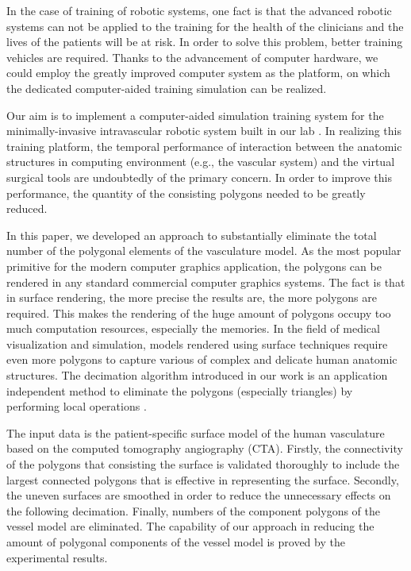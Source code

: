 In the case of training of robotic systems, one fact is that the advanced robotic systems can not be applied to the training for the health of the clinicians and the lives of the patients will be at risk. %
In order to solve this problem, better training vehicles are required.
Thanks to the advancement of computer hardware, we could employ the greatly improved computer system as the platform, on which the dedicated computer-aided training simulation can be realized. %

Our aim is to implement a computer-aided simulation training system for the minimally-invasive intravascular robotic system built in our lab \cite{Ji2011EMBC}.
In realizing this training platform, the temporal performance of interaction between the anatomic structures in computing environment (e.g., the vascular system) and the virtual surgical tools are undoubtedly of the primary concern. %
In order to improve this performance, the quantity of the consisting polygons needed to be greatly reduced.

In this paper, we developed an approach to substantially eliminate the total number of the polygonal elements of the vasculature model.
As the most popular primitive for the modern computer graphics application, the polygons can be rendered in any standard commercial computer graphics systems.
The fact is that in surface rendering, the more precise the results are, the more polygons are required.
This makes the rendering of the huge amount of polygons occupy too much computation resources, especially the memories.
In the field of medical visualization and simulation, models rendered using surface techniques require even more polygons to capture various of complex and delicate human anatomic structures. %
The decimation algorithm introduced in our work is an application independent method to eliminate the polygons (especially triangles) by performing local operations \cite{Schroeder1992}. %

The input data is the patient-specific surface model of the human vasculature based on the computed tomography angiography (CTA).
Firstly, the connectivity of the polygons that consisting the surface is validated thoroughly to include the largest connected polygons that is effective in representing the surface. %
Secondly, the uneven surfaces are smoothed in order to reduce the unnecessary effects on the following decimation.
Finally, numbers of the component polygons of the vessel model are eliminated.
The capability of our approach in reducing the amount of polygonal components of the vessel model is proved by the experimental results.

